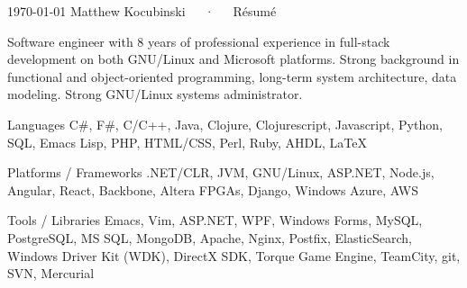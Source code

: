 \documentclass[11pt, letterpaper]{awesome-cv}
\begin{document}
\makecvheader

\makecvfooter
  {\today}
  {Matthew Kocubinski~~~·~~~Résumé}
  {\thepage}



\begin{cvparagraph}
\raggedright
Software engineer with 8 years of professional experience in full-stack development on both GNU/Linux
and Microsoft platforms.  Strong background in functional and object-oriented programming, long-term system architecture, data modeling.  Strong GNU/Linux systems administrator. 
\end{cvparagraph}




\begin{cvskills}

  \cvskill
    {Languages} %
    {C\#, F\#, C/C++, Java, Clojure, Clojurescript, Javascript, Python, SQL, Emacs Lisp, PHP, HTML/CSS, Perl, Ruby, AHDL, LaTeX} %

  \cvskill
    {Platforms / Frameworks} %
    {.NET/CLR, JVM, GNU/Linux, ASP.NET, Node.js, Angular, React, Backbone, Altera FPGAs, Django, Windows Azure, AWS } %

  \cvskill
    {Tools / Libraries} %
    {Emacs, Vim, ASP.NET, WPF, Windows Forms, MySQL, PostgreSQL, MS SQL, MongoDB, Apache, Nginx, Postfix, ElasticSearch, Windows Driver Kit (WDK), DirectX SDK, Torque Game Engine, TeamCity, git, SVN, Mercurial}

\end{cvskills}
\end{document}
